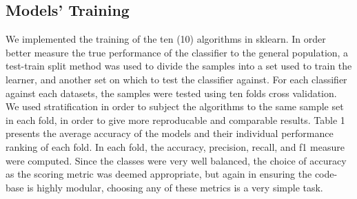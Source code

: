 \documentclass[conference]{IEEEtran}
\begin{document}
\subsection{Models' Training}
We implemented the training of the ten (10) algorithms in sklearn. In order  better measure the true performance of the classifier to the general population, a test-train split method was used to divide the samples into a set used to train the learner, and another set on which to test the classifier against. For each classifier against each datasets, the samples were tested using ten folds cross validation. We used stratification in order to subject the algorithms to the same sample set in each fold, in order to give more reproducable and comparable results. Table 1 presents the average accuracy of the models and their individual performance ranking of each fold. In each fold, the accuracy, precision, recall, and f1 measure were computed. Since the classes were very well balanced, the choice of accuracy as the scoring metric was deemed appropriate, but again in ensuring the code-base is highly modular, choosing any of these metrics is a very simple task.




%
%

\end{document}
